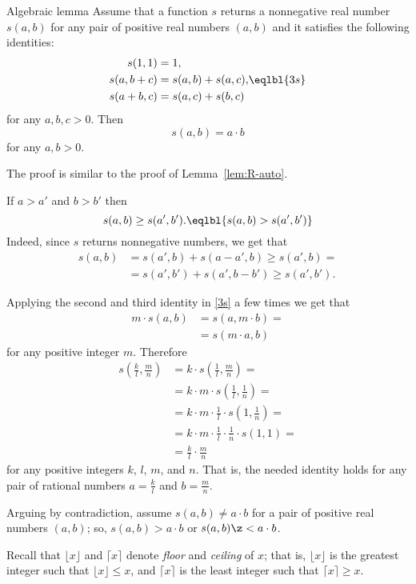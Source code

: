 \begin{thm}{Algebraic lemma}\label{lem:alg-area}
Assume that a function $s$
returns a nonnegative real number $s(a,b)$
for any pair of positive real numbers $(a,b)$
and it satisfies the following identities:
\[\begin{aligned}
s(1,1)&=1,
\\
s(a,b+c)&=s(a,b)+s(a,c),
\\
s(a+b,c)&=s(a,c)+s(b,c)
\end{aligned}
\eqlbl{3s}
\]
for any $a,b,c>0$.
Then
\[s(a,b)=a\cdot b\]
for any $a,b>0$.
\end{thm}

The proof is similar to the proof of Lemma~\ref{lem:R-auto}.

If $a>a'$ and $b>b'$ then
\[s(a,b)\ge s(a',b').\eqlbl{s(a,b)>s(a',b')}\]
Indeed, since $s$ returns nonnegative numbers, we get that
\begin{align*}
s(a,b)&=s(a',b)+s(a-a',b)\ge s(a',b)=
\\
&= s(a',b')+s(a',b-b')\ge s(a',b').
\end{align*}

Applying the second and third identity in \ref{3s} a few times we get that
\begin{align*}
m\cdot s(a,b)&=s(a,m\cdot b)=
\\&=s(m\cdot a,b)
\end{align*}
for any positive integer $m$. Therefore
\begin{align*}
s(\tfrac kl,\tfrac mn)
&=k \cdot s(\tfrac 1l,\tfrac mn)=
\\
&=k\cdot m \cdot s(\tfrac 1l,\tfrac 1n)=
\\
&=k\cdot m\cdot \tfrac 1l\cdot s(1, \tfrac 1n)=
\\
&=k\cdot m\cdot \tfrac 1l\cdot \tfrac 1n\cdot s(1,1)=
\\
&=\tfrac kl\cdot\tfrac mn
\end{align*}
for any positive integers $k$, $l$, $m$, and $n$.
That is, the needed identity holds for any pair of rational numbers $a=\tfrac kl$ and $b=\tfrac mn$.

Arguing by contradiction, assume $s(a,b)\ne a\cdot b$ for a pair of positive real numbers $(a,b)$;
so, $s(a,b)> a\cdot b$ or $s(a,b)\z< a\cdot b$.

Recall that $\lfloor x \rfloor$ and $\lceil x \rceil$  denote \emph{floor} and \emph{ceiling} of $x$;
that is, $\lfloor x \rfloor$ is the greatest integer such that $\lfloor x \rfloor\le x$,
and $\lceil x \rceil$ is the least integer such that $\lceil x \rceil\ge x$.


